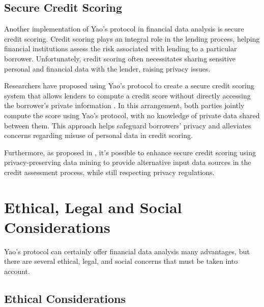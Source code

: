 \documentclass[12pt]{article}
\begin{document}
\subsection{Secure Credit Scoring}

Another implementation of Yao's protocol in financial data analysis is secure credit scoring. Credit scoring plays an integral role in the lending process, helping financial institutions assess the risk associated with lending to a particular borrower. Unfortunately, credit scoring often necessitates sharing sensitive personal and financial data with the lender, raising privacy issues.

Researchers have proposed using Yao's protocol to create a secure credit scoring system that allows lenders to compute a credit score without directly accessing the borrower's private information \cite{Scoring}. In this arrangement, both parties jointly compute the score using Yao's protocol, with no knowledge of private data shared between them. This approach helps safeguard borrowers' privacy and alleviates concerns regarding misuse of personal data in credit scoring.

Furthermore, as proposed in \cite{ScoringMining}, it's possible to enhance secure credit scoring using privacy-preserving data mining \cite{Mining} to provide alternative input data sources in the credit assessment process, while still respecting privacy regulations.

\section{Ethical, Legal and Social Considerations}\label{sec:sel}

Yao's protocol can certainly offer financial data analysis many advantages, but there are several ethical, legal, and social concerns that must be taken into account.

\subsection{Ethical Considerations}
\end{document}
